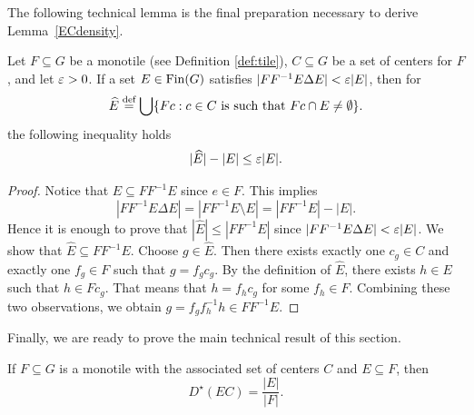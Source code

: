 \noindent 
The following technical lemma is the final preparation necessary to derive Lemma~\ref{ECdensity}.
\begin{lem}\label{lem:hatE-E}
Let $F\subseteq G$ be a monotile (see Definition \ref{def:tile}), $C\subseteq G$ be a set of centers for $F$, and let  $\varepsilon>0$. If a set $E\in\operatorname{Fin}(G)$ satisfies $|FF^{-1}E\Delta E|<\varepsilon|E|$, then for 
\[
\widehat E\stackrel{\textup{def}}{=}\bigcup\{Fc:c\in C \text{ is such that } Fc\cap E\neq\emptyset\}.
\]
the following inequality holds
\begin{equation*}\label{eq:1}
|\widehat E|-|E|\leq\varepsilon |E|.
\end{equation*}
\end{lem}
\begin{proof}
Notice that $E\subseteq FF^{-1}E$ since $e\in F$. This implies 
\begin{equation*}\label{eq:2}
|FF^{-1}E\Delta E| = |FF^{-1}E\setminus E|= |FF^{-1}E|-|E|.
\end{equation*}
Hence it is enough to prove that
$
|\widehat E|\leq |FF^{-1}E|
$
since $|FF^{-1}E\Delta E|<\varepsilon|E|$.
We show that $\widehat E\subseteq FF^{-1}E$.
Choose $g\in\widehat E$. Then there exists exactly one $c_g\in C$ and exactly one $f_g\in F$ such that $g=f_gc_g$. 
By the definition of $\widehat E$, there exists $h\in E$ such that $h\in Fc_g$. 
That means that $h=f_hc_g$ for some $f_h\in F$. 
Combining these two observations, we obtain $g=f_gf_h^{-1}h\in FF^{-1}E$.
\end{proof}

\noindent
Finally, we are ready to prove the main technical result of this section.
\begin{lem}\label{ECdensity}
If 
$F\subseteq G$ is a monotile with the associated set of centers $C$ and $E\subseteq F$, then 
\[
 D^\star(EC)=\frac{|E|}{|F|}.
 \]
\end{lem}

